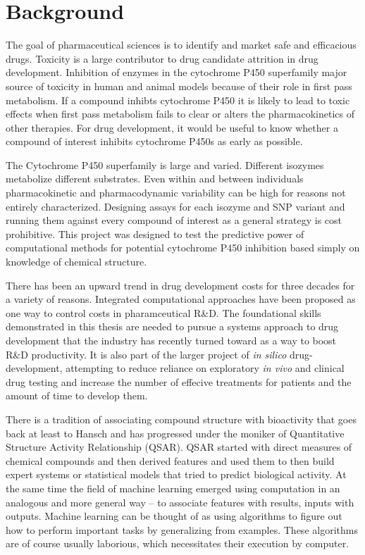 
\section{Background}
The goal of pharmaceutical sciences is to identify and market safe and efficacious drugs. Toxicity is a large contributor to drug candidate attrition in drug development. Inhibition of enzymes in the cytochrome P450 superfamily major source of toxicity in human and animal models because of their role in first pass metabolism. If a compound inhibts cytochrome P450 it is likely to lead to toxic effects when first pass metabolism fails to clear or alters the pharmacokinetics of other therapies. For drug development, it would be useful to know whether a compound of interest inhibits cytochrome P450s as early as possible.

The Cytochrome P450 superfamily is large and varied. Different isozymes metabolize different substrates. Even within and between individuals pharmacokinetic and pharmacodynamic variability can be high for reasons not entirely characterized. Designing assays for each isozyme and SNP variant and running them against every compound of interest as a general strategy is cost prohibitive. This project was designed to test the predictive power of computational methods for potential cytochrome P450 inhibition based simply on knowledge of chemical structure.

There has been an upward trend in drug development costs for three decades for a variety of reasons. Integrated computational approaches have been proposed as one way to control costs in pharamceutical R\&D. \cite{Visser2014} The foundational skills demonstrated in this thesis are needed to pursue a systems approach to drug development that the industry has recently turned toward as a way to boost R\&D productivity.\cite{Visser2014,Berg2014} It is also part of the larger project of \textit{in silico} drug-development, attempting to reduce reliance on exploratory \textit{in vivo} and clinical drug testing and increase the number of effecive treatments for patients and the amount of time to develop them.

There is a tradition of associating compound structure with bioactivity that goes back at least to Hansch\cite{Hansch1964} and has progressed under the moniker of Quantitative Structure Activity Relationship (QSAR). QSAR started with direct measures of chemical compounds and then derived features and used them to then build expert systems or statistical models that tried to predict biological activity. At the same time the field of machine learning emerged using computation in an analogous and more general way -- to associate features with results, inputs with outputs. Machine learning can be thought of as using algorithms to figure out how to perform important tasks by generalizing from examples. These algorithms are of course usually laborious, which necessitates their execution by computer.

